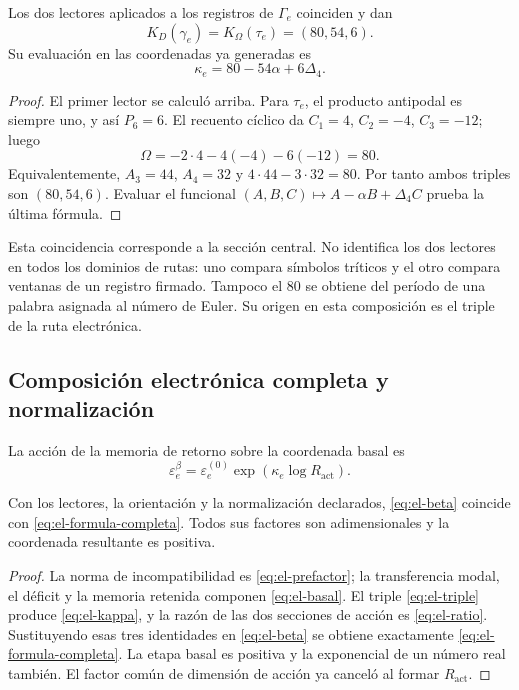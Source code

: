 \begin{theorem}
Los dos lectores aplicados a los registros de \(\Gamma_e\)
coinciden y dan
\begin{equation}
 K_D(\gamma_e)=K_\Omega(\tau_e)=(80,54,6).
 \label{eq:el-triple}
\end{equation}
Su evaluación en las coordenadas ya generadas es
\begin{equation}
 \kappa_e=80-54\alpha+6\Delta_4.
 \label{eq:el-kappa}
\end{equation}
\end{theorem}
\begin{proof}
El primer lector se calculó arriba. Para \(\tau_e\), el producto
antipodal es siempre uno, y así \(P_6=6\). El recuento cíclico da
\(C_1=4\), \(C_2=-4\), \(C_3=-12\); luego
\[
 \Omega=-2\cdot4-4(-4)-6(-12)=80.
\]
Equivalentemente, \(A_3=44\), \(A_4=32\) y
\(4\cdot44-3\cdot32=80\). Por tanto ambos triples son
\((80,54,6)\). Evaluar el funcional
\((A,B,C)\mapsto A-\alpha B+\Delta_4C\) prueba la última fórmula.
\end{proof}

Esta coincidencia corresponde a la sección central. No identifica los
dos lectores en todos los dominios de rutas: uno compara símbolos
tríticos y el otro compara ventanas de un registro firmado. Tampoco el
\(80\) se obtiene del período de una palabra asignada al número de
Euler. Su origen en esta composición es el triple de la ruta
electrónica.

\subsection{Composición electrónica completa y normalización}

\begin{definition}
La acción de la memoria de retorno sobre la coordenada basal es
\begin{equation}
 \varepsilon_e^\beta
 =\varepsilon_e^{(0)}\exp\!\left(\kappa_e\log R_{\mathrm{act}}\right).
 \label{eq:el-beta}
\end{equation}
\end{definition}

\begin{theorem}
Con los lectores, la orientación y la normalización declarados,
\eqref{eq:el-beta} coincide con \eqref{eq:el-formula-completa}. Todos
sus factores son adimensionales y la coordenada resultante es positiva.
\end{theorem}
\begin{proof}
La norma de incompatibilidad es \eqref{eq:el-prefactor}; la transferencia modal,
el déficit y la memoria retenida componen \eqref{eq:el-basal}. El
triple \eqref{eq:el-triple} produce \eqref{eq:el-kappa}, y la razón de
las dos secciones de acción es \eqref{eq:el-ratio}. Sustituyendo esas
tres identidades en \eqref{eq:el-beta} se obtiene exactamente
\eqref{eq:el-formula-completa}. La etapa basal es positiva y la
exponencial de un número real también. El factor común de dimensión de
acción ya canceló al formar \(R_{\mathrm{act}}\).
\end{proof}

